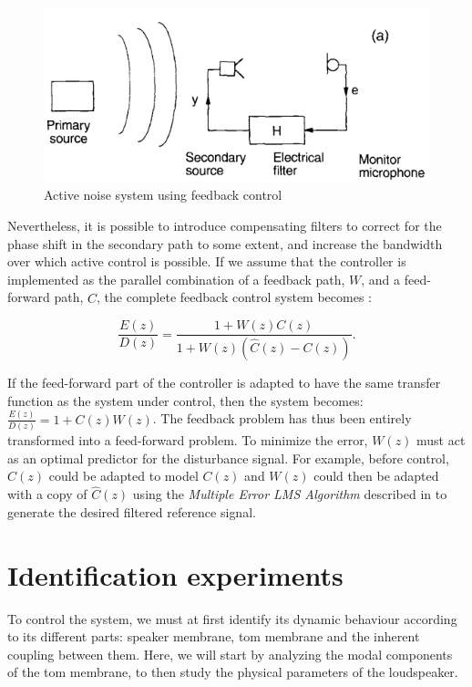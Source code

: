 \documentclass[11pt, twocolumn]{article}
\begin{document}
 \begin{figure}[h]
     \centering
     \includegraphics[width = 7 cm]{feedback_scheme.PNG}
     \caption{Active noise system using feedback control \cite{248551}}
     \label{feedforward}
 \end{figure}
\vspace{10 pt}

Nevertheless, it is possible to introduce compensating filters to correct for the phase shift in the secondary path to some extent, and increase the bandwidth over which active control is possible. If we assume that the controller is implemented as the parallel combination of a feedback path, $W$, and a feed-forward path, $\hat{C}$, the complete feedback control system becomes :

\begin{equation*}
    \frac{E(z)}{D(z)} = \frac{1 + W(z)C(z)}{1 + W(z)(\hat{C}(z) - C(z))}.
\end{equation*}

If the feed-forward part of the controller is adapted to have the same transfer function as the system under control, then the system becomes: $\frac{E(z)}{D(z)} = 1 + C(z)W(z)$. The feedback problem has thus been entirely transformed into a feed-forward problem. To minimize the error, $W(z)$ must act as an optimal predictor for the disturbance signal. For example, before control, $\hat{C}(z)$ could be adapted to model $C(z)$ and $W(z)$ could then be adapted with a copy of $\hat{C}(z)$ using the \textit{Multiple Error LMS Algorithm} described in \cite{248551} to generate the desired filtered reference signal.

\section{Identification experiments}

To control the system, we must at first identify its dynamic behaviour according to its different parts: speaker membrane, tom membrane and the inherent coupling between them. Here, we will start by analyzing the modal components of the tom membrane, to then study the physical parameters of the loudspeaker.
\end{document}
